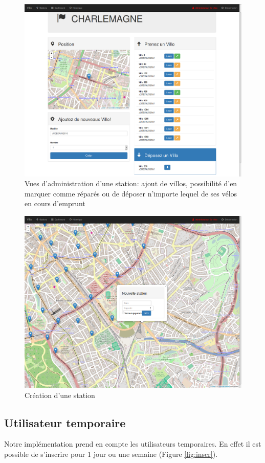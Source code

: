 \documentclass[a4paper,10pt]{article}
\begin{document}
\begin{figure}[H]
  \centering
  \includegraphics[width=.9\textwidth]{admin-station.png}
  \caption{\label{fig:admin-station} Vues d'administration d'une station: ajout de
    villos, possibilité d'en marquer comme réparés ou de déposer n'importe lequel
    de ses vélos en cours d'emprunt}
\end{figure}

\begin{figure}[H]
  \centering
  \includegraphics[width=.9\textwidth]{create-station.png}
  \caption{\label{fig:create-station} Création d'une station}
\end{figure}

\subsection{Utilisateur temporaire}
Notre implémentation prend en compte les utilisateurs temporaires.
En effet il est possible de s'inscrire pour 1 jour ou une semaine (Figure \ref{fig:inscr}).
\end{document}
